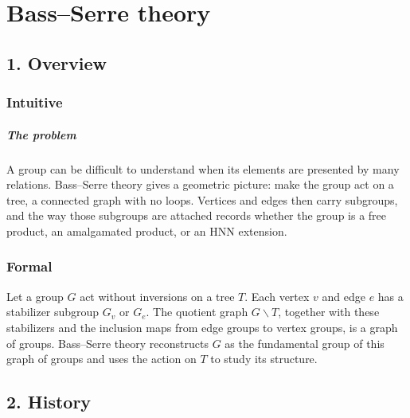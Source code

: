 \clearpage\chapter{Bass--Serre theory}
\section*{1. Overview}
\subsection*{Intuitive}
\paragraph{The problem}

A group can be difficult to understand when its elements are presented by many relations. Bass--Serre theory gives a geometric picture: make the group act on a tree, a connected graph with no loops. Vertices and edges then carry subgroups, and the way those subgroups are attached records whether the group is a free product, an amalgamated product, or an HNN extension.



\subsection*{Formal}
Let a group $G$ act without inversions on a tree $T$. Each vertex $v$ and edge $e$ has a stabilizer subgroup $G_v$ or $G_e$. The quotient graph $G\backslash T$, together with these stabilizers and the inclusion maps from edge groups to vertex groups, is a graph of groups. Bass--Serre theory reconstructs $G$ as the fundamental group of this graph of groups and uses the action on $T$ to study its structure.
\section*{2. History}
